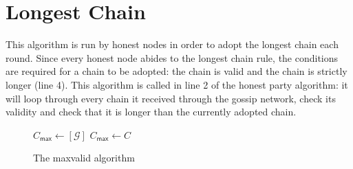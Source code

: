 \section{Longest Chain}
This algorithm is run by honest nodes in order to adopt the longest chain each round. Since every honest node abides to the longest chain rule, the conditions are required for a chain to be adopted: the chain is valid and the chain is strictly longer (line 4). This algorithm is called in line 2 of the honest party algorithm: it will loop through every chain it received through the gossip network, check its validity and check that it is longer than the currently adopted chain.
\begin{figure}[H]
\begin{algorithm}[H]
    \caption{\label{alg.maxvalid} The maxvalid algorithm}
    \begin{algorithmic}[1]
        \State $C_\textsf{max} \leftarrow [\mathcal{G}]$ 
         
             
                \State $C_\textsf{max} \leftarrow C$
            \EndIf
        \EndFor
        \State{}
    \EndFunction
    \end{algorithmic}
\end{algorithm}
\end{figure}

